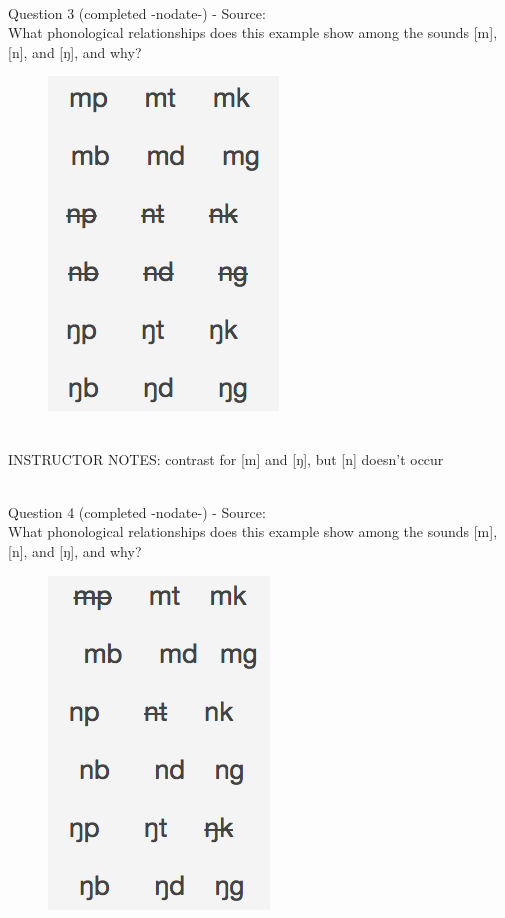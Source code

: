 \documentclass[12pt]{article}
\begin{document}
~\\

{\large Question 3} (completed -nodate-) - Source: \\

What phonological relationships does this example show among the sounds [m], [n], and [ŋ], and why?\\

\begin{figure}[H]
\includegraphics{../images/quiz4question5_c.png}
\end{figure}

~\\
INSTRUCTOR NOTES: contrast for [m] and [ŋ], but [n] doesn't occur


~\\

{\large Question 4} (completed -nodate-) - Source: \\

What phonological relationships does this example show among the sounds [m], [n], and [ŋ], and why?\\

\begin{figure}[H]
\includegraphics{../images/quiz4question5_d.png}
\end{figure}
\end{document}
